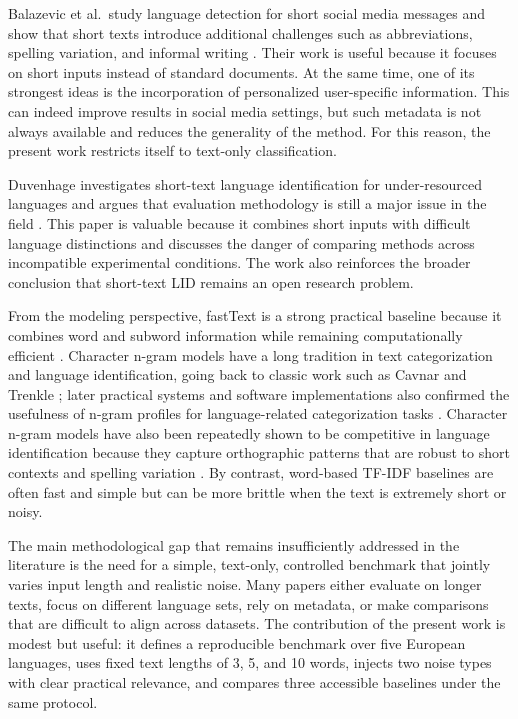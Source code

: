 \documentclass[conference]{IEEEtran}
\begin{document}
Balazevic et al.\ study language detection for short social media messages and show that short texts introduce additional challenges such as abbreviations, spelling variation, and informal writing \cite{balazevic2016shortsocial}. Their work is useful because it focuses on short inputs instead of standard documents. At the same time, one of its strongest ideas is the incorporation of personalized user-specific information. This can indeed improve results in social media settings, but such metadata is not always available and reduces the generality of the method. For this reason, the present work restricts itself to text-only classification.

Duvenhage investigates short-text language identification for under-resourced languages and argues that evaluation methodology is still a major issue in the field \cite{duvenhage2019short}. This paper is valuable because it combines short inputs with difficult language distinctions and discusses the danger of comparing methods across incompatible experimental conditions. The work also reinforces the broader conclusion that short-text LID remains an open research problem.

From the modeling perspective, fastText is a strong practical baseline because it combines word and subword information while remaining computationally efficient \cite{joulin2017fasttext}. Character n-gram models have a long tradition in text categorization and language identification, going back to classic work such as Cavnar and Trenkle \cite{cavnar1994ngram}; later practical systems and software implementations also confirmed the usefulness of n-gram profiles for language-related categorization tasks \cite{hornik2013textcat}. Character n-gram models have also been repeatedly shown to be competitive in language identification because they capture orthographic patterns that are robust to short contexts and spelling variation \cite{jauhiainen2019survey}. By contrast, word-based TF-IDF baselines are often fast and simple but can be more brittle when the text is extremely short or noisy.

The main methodological gap that remains insufficiently addressed in the literature is the need for a simple, text-only, controlled benchmark that jointly varies input length and realistic noise. Many papers either evaluate on longer texts, focus on different language sets, rely on metadata, or make comparisons that are difficult to align across datasets. The contribution of the present work is modest but useful: it defines a reproducible benchmark over five European languages, uses fixed text lengths of 3, 5, and 10 words, injects two noise types with clear practical relevance, and compares three accessible baselines under the same protocol.
\end{document}
